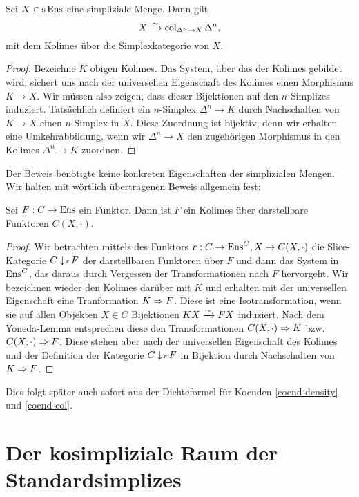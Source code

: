 \begin{lemma} \label{sset-col}
  Sei $X \in \operatorname{s}\operatorname{Ens}$ eine simpliziale Menge. Dann gilt
  \[ X \xrightarrow[]{\sim} \operatorname{col}_{\Delta^n \to X} \Delta^n, \]
  mit dem Kolimes über die Simplexkategorie von $X$.
\end{lemma}
\begin{proof}
  Bezeichne $K$ obigen Kolimes. Das System, über das der Kolimes
  gebildet wird, sichert uns nach der universellen Eigenschaft des
  Kolimes einen Morphismus $K \to X$. Wir müssen also zeigen, dass
  dieser Bijektionen auf den $n$-Simplizes induziert. Tatsächlich
  definiert ein $n$-Simplex $\Delta^n \to K$ durch Nachschalten von
  $K \to X$ einen $n$-Simplex in $X$. Diese Zuordnung ist bijektiv,
  denn wir erhalten eine Umkehrabbildung, wenn wir $\Delta^n \to X$
  den zugehörigen Morphismus in den Kolimes $\Delta^n \to K$ zuordnen.
\end{proof}
Der Beweis benötigte keine konkreten Eigenschaften der simplizialen
Mengen. Wir halten mit wörtlich übertragenen Beweis allgemein fest:
\begin{prop}
  Sei $F: C \to \operatorname{Ens}$ ein Funktor. Dann ist $F$ ein Kolimes über
  darstellbare Funktoren $C(X, \cdot)$.
\end{prop}
\begin{proof}
  Wir betrachten mittels des Funktors $r: C \to \operatorname{Ens}^C, X \mapsto
  C(X, \cdot)$ die Slice-Kategorie $C \downarrow \! {\scriptstyle r} \, F$ der
  darstellbaren Funktoren über $F$ und dann das System in $\operatorname{Ens}^C$,
  das daraus durch Vergessen der Transformationen nach $F$
  hervorgeht. Wir bezeichnen wieder den Kolimes darüber mit $K$ und
  erhalten mit der universellen Eigenschaft eine Tranformation
  $K \Rightarrow F$. Diese ist eine Isotransformation, wenn sie auf allen
  Objekten $X \in C$ Bijektionen $KX \xrightarrow[]{\sim} FX$ induziert. Nach dem
  Yoneda-Lemma entsprechen diese den Transformationen
  $C(X, \cdot) \Rightarrow K$ bzw. $C(X, \cdot) \Rightarrow F$. Diese stehen
  aber nach der universellen Eigenschaft des Kolimes und der
  Definition der Kategorie $C \downarrow \! {\scriptstyle r} \, F$ in Bijektion durch
  Nachschalten von $K \Rightarrow F$.
\end{proof}
\begin{bem}
  Dies folgt später auch sofort aus der Dichteformel für Koenden
  \ref{coend-density} und \ref{coend-col}.
\end{bem}

\section{Der kosimpliziale Raum der Standardsimplizes}


